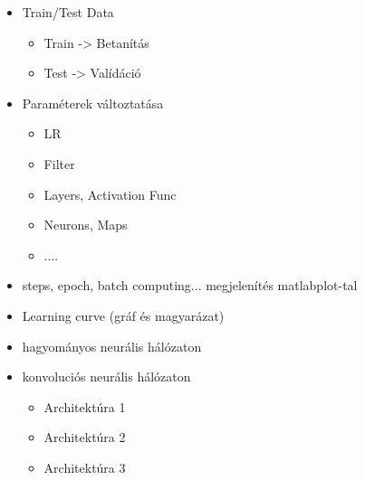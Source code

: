 
\begin{itemize}
\item Train/Test Data
	\begin{itemize}
	\item Train -> Betanítás
	\item Test -> Valídáció	
	\end{itemize}
\end{itemize}

\begin{itemize}
\item Paraméterek változtatása
	\begin{itemize}
	\item LR
	\item Filter
	\item Layers, Activation Func
	\item Neurons, Maps
	\item ....
	\end{itemize}
\item steps, epoch, batch computing... megjelenítés matlabplot-tal
\item Learning curve (gráf és magyarázat)
\end{itemize}

\begin{itemize}
\item hagyományos neurális hálózaton
\item konvoluciós neurális hálózaton
	\begin{itemize}
	\item Architektúra 1
	\item Architektúra 2
	\item Architektúra 3
	\end{itemize}
\end{itemize}